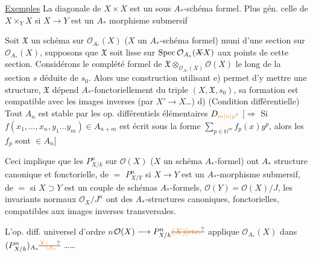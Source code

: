 \uline{Exemples} La diagonale de $X\times X$ est un sous $A_*$-schéma formel. Plus gén. celle de $X\times_Y X$ si $X\to Y$ est un $A_*$ morphisme submersif 


Soit $\mathfrak X$ un schéma sur $\mathcal O_{A_*}(X)$ ($X$ un $A_*$-schéma formel) muni d'une section  sur $\mathcal O_{A_*}(X)$, supposons que $\mathfrak X$ soit lisse sur $\mathrm{Spec}\,\mathcal O_{A_*}(\deleted{X}X)$ aux points de cette section. Considérons le complété formel  de $\mathfrak X\otimes_{\mathcal O_{A_*}(X)}\mathcal O(X)$ le long de la section $s$ déduite de $s_0$. Alors une construction utilisant e) permet d'y mettre une structure,   $\mathfrak X$  dépend $A_*$-fonctoriellement du triple $(X,\mathfrak X,s_0)$, sa formation est compatible avec les images inverses (par $X'\to X$\ldots)
d) (Condition différentielle) Tout $A_n$ est stable par les op. différentiels élémentaires $D_{\unsure{m|n|p}}$ [$\Longrightarrow$ Si $f(x_1,\ldots,x_n,y_1\ldots y_m)\in A_{n+m}$ est écrit sous la forme $\sum_{p\in\mathbb N^m}f_p(x)y^p$, alors les $f_p$ sont $\in A_n$]


Ceci implique que les  $P^n_{X/k}$ sur $\mathcal O(X)$ ($X$ un  schéma $A_*$-formel) ont  $A_*$ structure canonique et fonctorielle, de $=$ $P^n_{X/Y}$ si $X\to Y$ est un $A_*$-morphisme submersif, de $=$  si $X\supset Y$ est un couple de schémas $A_*$-formels, $\mathcal O(Y)=\mathcal O(X)/J$, les invariants normaux $\mathcal O_X/J^n$ ont des $A_*$-structures canoniques, fonctorielles, compatibles aux images inverses transversales.

L'op. diff. universel d'ordre $n$\quad $\mathcal O(X)\longrightarrow P^n_{X/k}\deleted{\unsure{(X)|\text{etc.}}}$  applique $\mathcal O_{A_*}(X)$ dans $(P^n_{X/k})_{A_*}\deleted{\unsure{^{X}|_{A_*}}}$ \ldots\ldots

